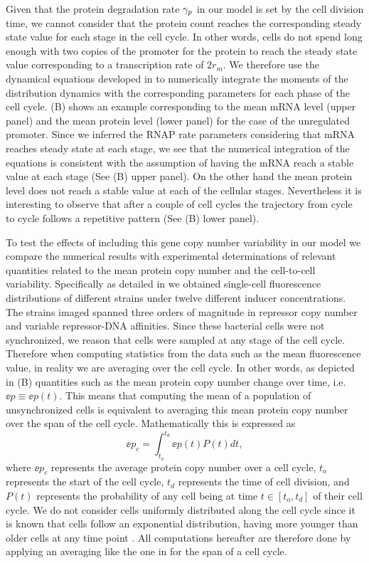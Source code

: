 Given that the protein degradation rate $\gamma _p$ in our model is set by the cell
division time, we cannot consider that the protein count reaches the
corresponding steady state value for each stage in the cell cycle. In other
words, cells do not spend long enough with two copies of the promoter for the
protein to reach the steady state value corresponding to a transcription rate of
$2 r_m$. We therefore use the dynamical equations developed in
 to numerically integrate the moments of the distribution
dynamics with the corresponding parameters for each phase of the cell cycle.
(B) shows an example corresponding to the mean mRNA level
(upper panel) and the mean protein level (lower panel) for the case of the
unregulated promoter. Since we inferred the RNAP rate parameters considering
that mRNA reaches steady state at each stage, we see that the numerical
integration of the equations is consistent with the assumption of having the
mRNA reach a stable value at each stage (See (B) upper
panel). On the other hand the mean protein level does not reach a stable value
at each of the cellular stages. Nevertheless it is interesting to observe that
after a couple of cell cycles the trajectory from cycle to cycle follows a
repetitive pattern (See (B) lower panel).

To test the effects of including this gene copy number variability in our
model we compare the numerical results with experimental determinations of
relevant quantities related to the mean protein copy number and the cell-to-cell
variability. Specifically as detailed in  we obtained single-cell
fluorescence distributions of different strains under twelve different inducer
concentrations. The strains imaged spanned three orders of magnitude in
repressor copy number and variable repressor-DNA affinities. Since these
bacterial cells were not synchronized, we reason that cells were sampled at any
stage of the cell cycle. Therefore when computing statistics from the data such
as the mean fluorescence value, in reality we are averaging over the cell
cycle. In other words, as depicted in (B) quantities such
as the mean protein copy number change over time, i.e. $\ee{p} \equiv
\ee{p(t)}$. This means that computing the mean of a population of unsynchronized
cells is equivalent to averaging this mean protein copy number over the span of
the cell cycle. Mathematically this is expressed as
\begin{equation}
	\ee{p}_c = \int_{t_o}^{t_d} \ee{p(t)} P(t) dt,
	\label{eq_time_avg}
\end{equation}
where $\ee{p}_c$ represents the average protein copy number over a cell cycle,
$t_o$ represents the start of the cell cycle, $t_d$ represents the time of cell
division, and $P(t)$ represents the probability of any cell being at time $t \in
[t_o, t_d]$ of their cell cycle. We do not consider cells uniformly distributed
along the cell cycle since it is known that cells follow an exponential
distribution, having more younger than older cells at any time point
\cite{Powell1956}. All computations hereafter are therefore done by applying an
averaging like the one in  for the span of a cell cycle.

